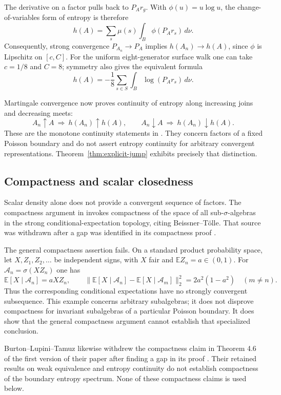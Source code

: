 \documentclass[11pt,letterpaper]{amsart}
\theoremstyle{definition}
\theoremstyle{remark}
\numberwithin{equation}{section}
\begin{document}
The derivative on a factor pulls back to $P_A r_g$. With
$\phi(u)=u\log u$, the change-of-variables form of entropy is therefore
\begin{equation}\label{eq:conditional-entropy}
 h(A)=\sum_s\mu(s)\int_B\phi(P_A r_s)\,d\nu.
\end{equation}
Consequently, strong convergence $P_{A_n}\to P_A$ implies
$h(A_n)\to h(A)$, since $\phi$ is Lipschitz on $[c,C]$.
For the uniform eight-generator surface walk one can take
$c=1/8$ and $C=8$; symmetry also gives the equivalent formula
\[
 h(A)=-\frac18\sum_{s\in S}\int_B\log(P_A r_s)\,d\nu.
\]

Martingale convergence now proves continuity of entropy along
increasing joins and decreasing meets:
\[
 A_n\uparrow A\ \Longrightarrow\ h(A_n)\uparrow h(A),
 \qquad
 A_n\downarrow A\ \Longrightarrow\ h(A_n)\downarrow h(A).
\]
These are the monotone continuity statements in
\cite[Theorem C]{Dodds}. They concern factors of a fixed Poisson
boundary and do not assert entropy continuity for arbitrary convergent
representations. Theorem~\ref{thm:explicit-jump} exhibits precisely
that distinction.

\subsection{Compactness and scalar closedness}

Scalar density alone does not provide a convergent sequence of factors.
The compactness argument in \cite[Section 4, Theorem D]{Dodds} invokes
compactness of the space of all sub-$\sigma$-algebras in the strong
conditional-expectation topology, citing Beissner--T\"olle. That source
was withdrawn after a gap was identified in its compactness proof
\cite{BT}.

The general compactness assertion fails. On a standard product
probability space, let $X,Z_1,Z_2,\ldots$ be independent signs, with
$X$ fair and $\mathbb E Z_n=a\in(0,1)$. For
$\mathcal A_n=\sigma(XZ_n)$ one has
\[
 \mathbb E[X\mid\mathcal A_n]=aXZ_n,
 \qquad
 \bigl\|\mathbb E[X\mid\mathcal A_n]
       -\mathbb E[X\mid\mathcal A_m]\bigr\|_2^2
 =2a^2(1-a^2)\quad(m\ne n).
\]
Thus the corresponding conditional expectations have no strongly
convergent subsequence. This example concerns arbitrary subalgebras;
it does not disprove compactness for invariant subalgebras of a
particular Poisson boundary. It does show that the general compactness
argument cannot establish that specialized conclusion.

Burton--Lupini--Tamuz likewise withdrew the compactness claim in
Theorem 4.6 of the first version of their paper after finding a gap
in its proof \cite{BLT}. Their retained results on weak equivalence
and entropy continuity do not establish compactness of the boundary
entropy spectrum. None of these compactness claims is used below.
\end{document}
